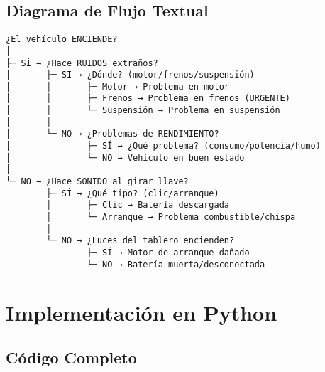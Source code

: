 \documentclass[12pt]{article}
\begin{document}
\subsection{Diagrama de Flujo Textual}

\begin{verbatim}
¿El vehículo ENCIENDE?
│
├─ SÍ → ¿Hace RUIDOS extraños?
│       ├─ SÍ → ¿Dónde? (motor/frenos/suspensión)
│       │       ├─ Motor → Problema en motor
│       │       ├─ Frenos → Problema en frenos (URGENTE)
│       │       └─ Suspensión → Problema en suspensión
│       │
│       └─ NO → ¿Problemas de RENDIMIENTO?
│               ├─ SÍ → ¿Qué problema? (consumo/potencia/humo)
│               └─ NO → Vehículo en buen estado
│
└─ NO → ¿Hace SONIDO al girar llave?
        ├─ SÍ → ¿Qué tipo? (clic/arranque)
        │       ├─ Clic → Batería descargada
        │       └─ Arranque → Problema combustible/chispa
        │
        └─ NO → ¿Luces del tablero encienden?
                ├─ SÍ → Motor de arranque dañado
                └─ NO → Batería muerta/desconectada
\end{verbatim}

\newpage

\section{Implementación en Python}

\subsection{Código Completo}
\end{document}
